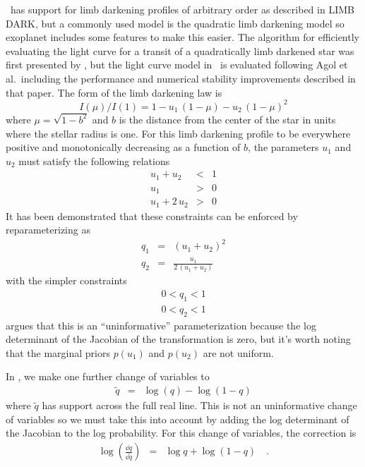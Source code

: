 \documentclass[modern]{aastex62}
\begin{document}
\exoplanet\ has support for limb darkening profiles of arbitrary order as described in LIMB DARK, but a commonly used model is the quadratic limb darkening model so exoplanet includes some features to make this easier.
The algorithm for efficiently evaluating the light curve for a transit of a quadratically limb darkened star was first presented by \citet{Mandel:2002}, but the light curve model in \exoplanet\ is evaluated following Agol et al.\ including the performance and numerical stability improvements described in that paper.
The form of the limb darkening law is
\begin{equation}
I(\mu)/I(1) = 1 - u_1\,(1 - \mu) - u_2\,(1 - \mu)^2
\end{equation}
where $\mu = \sqrt{1 - b^2}$ and $b$ is the distance from the center of the star in units where the stellar radius is one.
For this limb darkening profile to be everywhere positive and monotonically decreasing as a function of $b$, the parameters $u_1$ and $u_2$ must satisfy the following relations
\begin{eqnarray}
u_1 + u_2 &<& 1 \\
u_1 &>& 0 \\
u_1 + 2\,u_2 &>& 0
\end{eqnarray}
It has been demonstrated \citep[by][]{Kipping:2013} that these constraints can be enforced by reparameterizing as
\begin{eqnarray}
q_1 &=& (u_1 + u_2)^2 \\
q_2 &=& \frac{u_1}{2\,(u_1 + u_2)}
\end{eqnarray}
with the simpler constraints
\begin{eqnarray}
0 < q_1 < 1 \\
0 < q_2 < 1
\end{eqnarray}
\citet{Kipping:2013} argues that this is an ``uninformative'' parameterization because the log determinant of the Jacobian of the transformation is zero,  but it's worth noting that the marginal priors $p(u_1)$ and $p(u_2)$ are not uniform.

In \exoplanet, we make one further change of variables to
\begin{eqnarray}
\tilde{q} &=& \log(q) - \log(1-q)
\end{eqnarray}
where $\tilde{q}$ has support across the full real line.
This is not an uninformative change of variables so we must take this into account by adding the log determinant of the Jacobian to the log probability.
For this change of variables, the correction is
\begin{eqnarray}
\log\left(\frac{\dd q}{\dd\tilde{q}}\right) &=& \log q + \log(1 - q) \quad.
\end{eqnarray}
\end{document}
